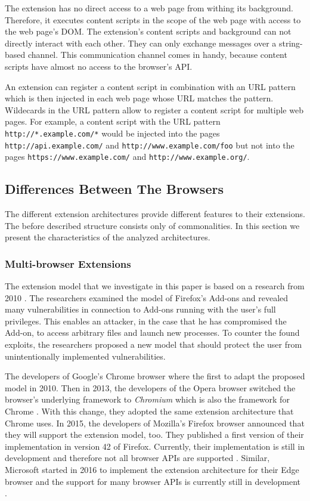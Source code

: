 {	The extension has no direct access to a web page from withing its background. Therefore, it executes content scripts in the scope of the web page with access to the web page's DOM. The extension's content scripts and background can not directly interact with each other. They can only exchange messages over a string-based channel. This communication channel comes in handy, because content scripts have almost no access to the browser's API. 
	
	An extension can register a content script in combination with an URL pattern which is then injected in each web page whose URL matches the pattern. Wildecards in the URL pattern allow to register a content script for multiple web pages. For example, a content script with the URL pattern \texttt{http://*.example.com/*} would be injected into the pages \texttt{http://api.example.com/} and \texttt{http://www.example.com/foo} but not into the pages \texttt{https://www.example.com/} and \texttt{http://www.example.org/}.



\subsection{Differences Between The Browsers}

	The different extension architectures provide different features to their extensions. The before described structure consists only of commonalities. In this section we present the characteristics of the analyzed architectures.
	
\subsubsection{Multi-browser Extensions}

	The extension model that we investigate in this paper is based on a research from 2010 \cite{Barth10protectingbrowsers}. The researchers examined the model of Firefox's Add-ons and revealed many vulnerabilities in connection to Add-ons running with the user's full privileges. This enables an attacker, in the case that he has compromised the Add-on, to access arbitrary files and launch new processes. To counter the found exploits, the researchers proposed a new model that should protect the user from unintentionally implemented vulnerabilities.
	
	The developers of Google's Chrome browser where the first to adapt the proposed model in 2010. Then in 2013, the developers of the Opera browser switched the browser's underlying framework to \textit{Chromium} which is also the framework for Chrome \cite{operaBlogSwitchToChromium}. With this change, they adopted the same extension architecture that Chrome uses. In 2015, the developers of Mozilla's Firefox browser announced that they will support the extension model, too. They published a first version of their implementation in version 42 of Firefox. Currently, their implementation is still in development and therefore not all browser APIs are supported \cite{mozillaWebExtensionStatus}. Similar, Microsoft started in 2016 to implement the extension architecture for their Edge browser and the support for many browser APIs is currently still in development \cite{edgeBrowserApiStatus}.
		
}
